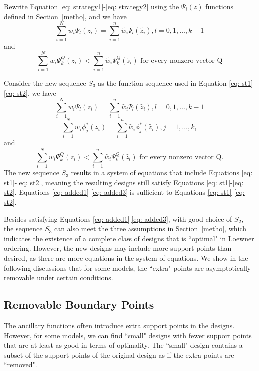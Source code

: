 \documentclass[12pt]{TD-CJS}
\begin{document}
Rewrite Equation \eqref{eq: strategy1}-\eqref{eq: strategy2} using the $\Psi_i(z)$ functions defined in Section~\ref{metho}, and we have
\begin{equation} \label{eq: st1}
\sum_{i=1}^Nw_i\Psi_l(z_i)=\sum_{i=1}^n\tilde{w_i}\Psi_l(\tilde{z_i}), l=0,1,\ldots, k-1
\end{equation} and \begin{equation} \label{eq: st2}
\sum_{i=1}^Nw_i\Psi_k^Q(z_i)<\sum_{i=1}^n\tilde{w_i}\Psi_k^Q(\tilde{z_i}) \text{  for every nonzero vector Q}
\end{equation}  



Consider the new sequence $S_3$ as the function sequence used in Equation \eqref{eq: st1}-\eqref{eq: st2}, we have \begin{equation}\label{eq: added1}
\sum_{i=1}^Nw_i\Psi_l(z_i)=\sum_{i=1}^n\tilde{w_i}\Psi_l(\tilde{z_i}), l=0,1,\ldots, k-1    
\end{equation}
\begin{equation}\label{eq: added2}
\sum_{i=1}^Nw_i\phi_j^*(z_i)=\sum_{i=1}^n\tilde{w_i}\phi_j^*(\tilde{z_i}), j=1,\ldots, k_1    
\end{equation}and \begin{equation}\label{eq: added3}
\sum_{i=1}^Nw_i\Psi_k^Q(z_i)<\sum_{i=1}^n\tilde{w_i}\Psi_k^Q(\tilde{z_i}) \text{  for every nonzero vector Q}.
\end{equation}
The new sequence $S_3$ results in a system of equations that include Equations \eqref{eq: st1}-\eqref{eq: st2}, meaning the resulting designs still satisfy Equations \eqref{eq: st1}-\eqref{eq: st2}. Equations \eqref{eq: added1}-\eqref{eq: added3} is sufficient to Equations \eqref{eq: st1}-\eqref{eq: st2}.


Besides satisfying Equations \eqref{eq: added1}-\eqref{eq: added3}, with good choice of $S_2$, the sequence $S_3$ can also meet the three assumptions in Section~\ref{metho}, which indicates the existence of a complete class of designs that is ``optimal" in Loewner ordering. However, the new designs may include more support points than desired, as there are more equations in the system of equations. We show in the following discussions that for some models, the ``extra" points are asymptotically removable under certain conditions.

 
\subsection{Removable Boundary Points}
The ancillary functions often introduce extra support points in the designs. However, for some models, we can find ``small" designs with fewer support points that are at least as good in terms of optimality. The ``small" design contains a subset of the support points of the original design as if the extra points are ``removed". 
\end{document}
